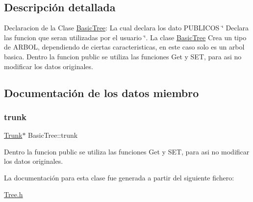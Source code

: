 \subsection{Descripción detallada}
Declaracion de la Clase \mbox{\hyperlink{class_basic_tree}{Basic\+Tree}}\+: La cual declara los dato P\+U\+B\+L\+I\+C\+OS \char`\"{} Declara las funcion que seran utilizadas por el usuario \char`\"{}. La clase \mbox{\hyperlink{class_basic_tree}{Basic\+Tree}} Crea un tipo de A\+R\+B\+OL, dependiendo de ciertas caracteristicas, en este caso solo es un arbol basica. Dentro la funcion public se utiliza las funciones Get y S\+ET, para asi no modificar los datos originales. 

\subsection{Documentación de los datos miembro}
\mbox{\label{class_basic_tree_ace2c7d40cde2b75633b634bfee0818d5}} 
\subsubsection{\texorpdfstring{trunk}{trunk}}
{\footnotesize\ttfamily \mbox{\hyperlink{class_trunk}{Trunk}}$\ast$ Basic\+Tree\+::trunk}

Dentro la funcion public se utiliza las funciones Get y S\+ET, para asi no modificar los datos originales. 

La documentación para esta clase fue generada a partir del siguiente fichero\+:\begin{DoxyCompactItemize}
\item 
\mbox{\hyperlink{_tree_8h}{Tree.\+h}}\end{DoxyCompactItemize}
